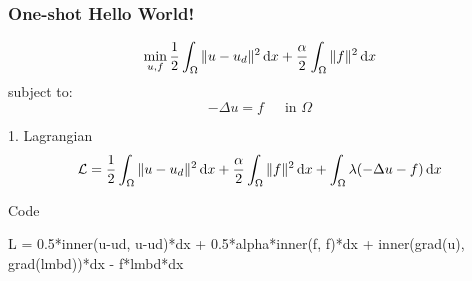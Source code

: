 \begin{frame}[fragile]
  \frametitle{One-shot Hello World!}
  \begin{equation*}
        \min_{u, f} \frac{1}{2} \int_\Omega \| u - u_d\|^2\, \mathrm{d}x + \frac{\alpha}{2} \int_\Omega \| f \|^2\, \mathrm{d}x 
  \end{equation*}
  subject to:
  \begin{equation*}
      - \Delta u = f \,\,\, \quad \mbox{in } \Omega
  \end{equation*}

      \begin{block}{1. Lagrangian}
  \begin{equation*}
        \mathcal L = \frac{1}{2} \int_\Omega \| u - u_d\|^2\, \mathrm{d}x + \frac{\alpha}{2} \int_\Omega \| f \|^2\, \mathrm{d}x 
        + \int_\Omega \lambda (- \Delta u - f) \, \mathrm{d}x
  \end{equation*}
  \end{block}

  \begin{block}{Code}
\begin{python}
L = 0.5*inner(u-ud, u-ud)*dx
  + 0.5*alpha*inner(f, f)*dx 
  + inner(grad(u), grad(lmbd))*dx
  - f*lmbd*dx
\end{python}
\end{block}
\end{frame}

